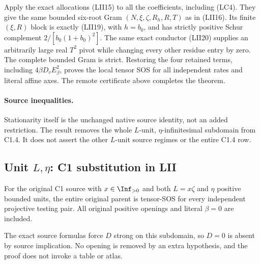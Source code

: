 Apply the exact allocations (LII15) to all the coefficients,
including (LC4).  They give the same bounded six-root Gram
$(N,\xi,\zeta,R_h,R,T)$ as in (LII16).  Its finite $(\xi,R)$
block is exactly (LII19), with $h=b_0$, and has strictly positive
Schur complement $2/[b_0(1+b_0)^2]$.  The same exact conductor
(LII20) supplies an arbitrarily large real $T^2$ pivot while
changing every other residue entry by zero.  The complete bounded
Gram is strict.  Restoring the four retained terms, including
$4\beta D_vE_\beta^2$, proves the local tensor SOS for all
independent rates and literal affine axes.  The remote certificate
above completes the theorem.

\paragraph{Source inequalities.}
  Stationarity
itself is the unchanged native source identity, not an added
restriction.  The result removes the whole $L$-unit, $\eta$-infinitesimal
subdomain from C1.4.  It does not assert the other $L$-unit source
regimes or the entire C1.4 row.



\subsection{Unit $L,\eta$: C1 substitution in LII}

\label{component:p686209b87229}

\label{p686209b87229:sec:r7-c1-L-eta-unit}

\begin{theorem}
For the original C1 source with $x\in\Inf_{>0}$ and both
$L=x\zeta$ and $\eta$ positive bounded units, the entire original
parent is tensor-SOS for every independent projective testing pair.
All original positive openings and literal $\beta=0$ are included.
\end{theorem}

The exact source formulas force $D$ strong on this subdomain, so
$D=0$ is absent by source implication.  No opening is removed by
an extra hypothesis, and the proof does not invoke a table or atlas.

